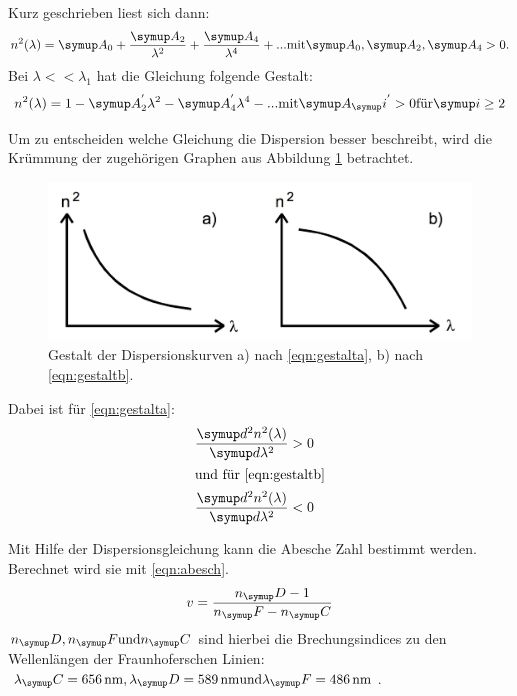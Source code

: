 Kurz geschrieben liest sich dann:
\begin{equation}
  n^2(\lambda) = \g{A}_0 + \frac{\g{A_2}}{\lambda^2} + \frac{\g{A_4}}{\lambda^4} + ...
  \text{mit} \g{A}_0, \g{A}_2, \g{A}_4 > 0.
  \label{eqn:gestalta}
\end{equation}
Bei $\lambda << \lambda_1$ hat die Gleichung folgende Gestalt:
\begin{equation}
  n^2(\lambda) = 1- \g{A}_2^{'} \lambda^2 - \g{A}_4^{'} \lambda^4 - ...
  \text{mit} \g{A}_\g{i}^{'} > 0 \text{für} \g{i} \geq 2
  \label{eqn:gestaltb}
\end{equation}

Um zu entscheiden welche Gleichung die Dispersion besser beschreibt, wird
die Krümmung der zugehörigen Graphen aus Abbildung \ref{fig:Dispersionskurven}
betrachtet.
\begin{figure}
  \centering
  \includegraphics[width = \textwidth]{Pics/Dispersionskurven.pdf}
  \caption{Gestalt der Dispersionskurven a) nach \eqref{eqn:gestalta}, b) nach \eqref{eqn:gestaltb}.}
  \label{fig:Dispersionskurven}
\end{figure}
Dabei ist für \eqref{eqn:gestalta}:
\begin{align*}
  \frac{\g{d}^2 n^2(\lambda)}{\g{d} \lambda^2} &> 0\\
  \intertext{und für \eqref{eqn:gestaltb}}
  \frac{\g{d}^2 n^2(\lambda)}{\g{d} \lambda^2} &< 0
\end{align*}

Mit Hilfe der Dispersionsgleichung kann die Abesche Zahl bestimmt werden.
Berechnet wird sie mit \eqref{eqn:abesch}.
\begin{equation}
  v = \frac{n_\g{D} -1 }{n_\g{F} - n_\g{C}}
  \label{eqn:abesch}
\end{equation}
$n_\g{D}, n_\g{F} \text{und} n_\g{C}$ sind hierbei die Brechungsindices zu den
Wellenlängen der Fraunhoferschen Linien: $\lambda_\g{C} = \SI{656}{\nano\meter},
\lambda_\g{D} = \SI{589}{\nano\meter} \text{und} \lambda_\g{F} = \SI{486}{\nano\meter}$.


